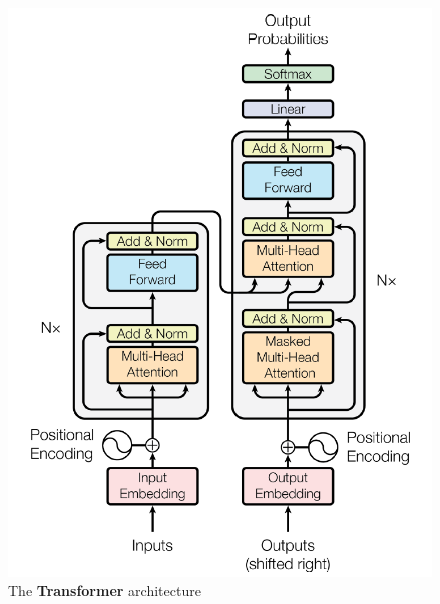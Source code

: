 \begin{figure}
    \centering
    \includegraphics[scale=0.8]{img/transformer_archs.png}
    \caption{The \textbf{Transformer} architecture}
    \label{fig:transformer_arch}
\end{figure}


